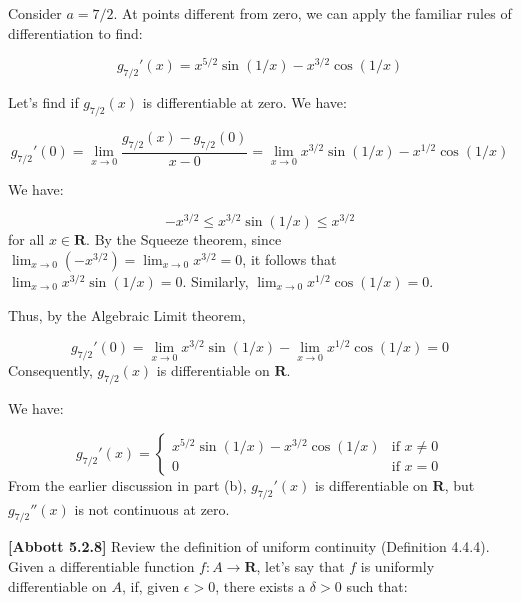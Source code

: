 \documentclass[10pt]{article}
\begin{document}
Consider $\displaystyle a=7/2$. At points different from zero, we can apply the familiar rules of differentiation to find:


\begin{equation*}
g_{7/2} '( x) =x^{5/2}\sin( 1/x) -x^{3/2}\cos( 1/x)
\end{equation*}


Let's find if $\displaystyle g_{7/2}( x)$ is differentiable at zero. We have:


\begin{equation*}
g_{7/2} '( 0) =\lim _{x\rightarrow 0}\frac{g_{7/2}( x) -g_{7/2}( 0)}{x-0} =\lim _{x\rightarrow 0} x^{3/2}\sin( 1/x) -x^{1/2}\cos( 1/x)
\end{equation*}


We have:


\begin{equation*}
-x^{3/2} \leq x^{3/2}\sin( 1/x) \leq x^{3/2}
\end{equation*}
for all $\displaystyle x\in \mathbf{R}$. By the Squeeze theorem, since $\displaystyle \lim _{x\rightarrow 0}\left( -x^{3/2}\right) =\lim _{x\rightarrow 0} x^{3/2} =0$, it follows that $\displaystyle \lim _{x\rightarrow 0} x^{3/2}\sin( 1/x) =0$. Similarly, $\displaystyle \lim _{x\rightarrow 0} x^{1/2}\cos( 1/x) =0$.



Thus, by the Algebraic Limit theorem,


\begin{equation*}
g_{7/2} '( 0) =\lim _{x\rightarrow 0} x^{3/2}\sin( 1/x) -\lim _{x\rightarrow 0} x^{1/2}\cos( 1/x) =0
\end{equation*}
Consequently, $\displaystyle g_{7/2}( x)$ is differentiable on $\displaystyle \mathbf{R}$.



We have:


\begin{equation*}
g_{7/2} '( x) =\begin{cases}
x^{5/2}\sin( 1/x) -x^{3/2}\cos( 1/x) & \text{if } x\neq 0\\
0 & \text{if } x=0
\end{cases}
\end{equation*}
From the earlier discussion in part (b), $\displaystyle g_{7/2} '( x)$ is differentiable on $\displaystyle \mathbf{R}$, but $\displaystyle g_{7/2} ''( x)$ is not continuous at zero.



\textbf{[Abbott 5.2.8] }Review the definition of uniform continuity (Definition 4.4.4). Given a differentiable function $\displaystyle f:A\rightarrow \mathbf{R}$, let's say that $\displaystyle f$ is uniformly differentiable on $\displaystyle A$, if, given $\displaystyle \epsilon  >0$, there exists a $\displaystyle \delta  >0$ such that:
\end{document}
